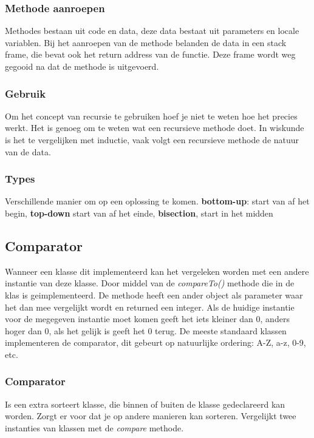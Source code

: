 \subsubsection{Methode aanroepen}
Methodes bestaan uit code en data, deze data bestaat uit parameters en locale variablen.
Bij het aanroepen van de methode belanden de data in een stack frame, die bevat ook het return address van de functie.
Deze frame wordt weg gegooid na dat de methode is uitgevoerd.

\subsubsection{Gebruik}
Om het concept van recursie te gebruiken hoef je niet te weten hoe het precies werkt.
Het is genoeg om te weten wat een recursieve methode doet.
In wiskunde is het te vergelijken met inductie, vaak volgt een recursieve methode de natuur van de data.

\subsubsection{Types}
Verschillende manier om op een oplossing te komen.
\textbf{bottom-up}: start van af het begin, \textbf{top-down} start van af het einde, \textbf{bisection}, start in het midden

\subsection{Comparator}
Wanneer een klasse dit implementeerd kan het vergeleken worden met een andere instantie van deze klasse.
Door middel van de \textit{compareTo()} methode die in de klas is geimplementeerd.
De methode heeft een ander object als parameter waar het dan mee vergelijkt wordt en returned een integer.
Als de huidige instantie voor de megegeven instantie moet komen geeft het iets kleiner dan 0, anders hoger dan 0, als het gelijk is geeft het 0 terug.
De meeste standaard klassen implementeren de comparator, dit gebeurt op natuurlijke ordering: A-Z, a-z, 0-9, etc.

\subsubsection{Comparator}
Is een extra sorteert klasse, die binnen of buiten de klasse gedeclareerd kan worden.
Zorgt er voor dat je op andere manieren kan sorteren.
Vergelijkt twee instanties van klassen met de \textit{compare} methode.

